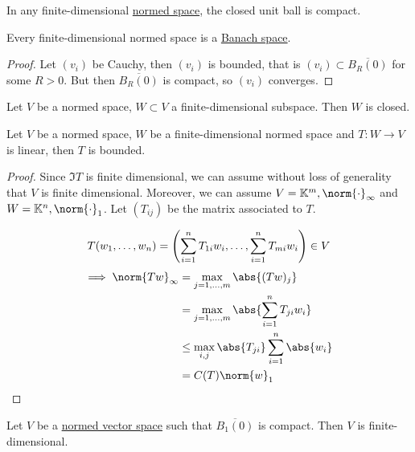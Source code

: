 \documentclass{article}
\newcommand{\K}{\mathbb{K}}
\begin{document}
\begin{cor}
    In any finite-dimensional \hyperlink{def:normedVectorSpace}{normed space}, the closed unit ball is compact.
\end{cor}

\begin{cor}
    Every finite-dimensional normed space is a \hyperlink{def:banach}{Banach space}.
\end{cor}

\begin{proof}
    Let $(v_i)$ be Cauchy, then $(v_i)$ is bounded, that is $(v_i) \subset \overline{B_R(0)}$ for some $R > 0$. But then $\overline{B_R(0)}$ is compact, so $(v_i)$ converges.
\end{proof}

\begin{cor}
    Let $V$ be a normed space, $W \subset V$ a finite-dimensional subspace. Then $W$ is closed.
\end{cor}

\begin{cor}
    Let $V$ be a normed space, $W$ be a finite-dimensional normed space and $T: W \to V$ is linear, then $T$ is bounded.
\end{cor}

\begin{proof}
    Since $\Im T$ is finite dimensional, we can assume without loss of generality that $V$ is finite dimensional.
    Moreover, we can assume $V = \K^m, \norm{\cdot}_\infty$ and $W = \K^n, \norm{\cdot}_1$.
    Let $(T_{ij})$ be the matrix associated to $T$.

    \begin{equation*}
        T(w_1, \dotsc, w_n)= \left(\sum_{i=1}^n T_{1i} w_i, \dotsc, \sum_{i=1}^n T_{mi} w_i\right) \in V \\
    \end{equation*}
    \begin{align*}
        \implies \norm{Tw}_\infty &= \max_{j = 1, \dotsc, m} \abs{(Tw)_j} \\
                                  &= \max_{j = 1, \dotsc, m} \abs{\sum_{i=1}^n T_{ji} w_i} \\
                                  &\leq \max_{i,j} \abs{T_{ji}} \sum_{i=1}^n \abs{w_i} \\
                                  &= C(T) \norm{w}_1
    \end{align*}
\end{proof}

\begin{thm}
    Let $V$ be a \hyperlink{def:normedVectorSpace}{normed vector space} such that $\overline{B_1(0)}$ is compact. Then $V$ is finite-dimensional.
\end{thm}
\end{document}
